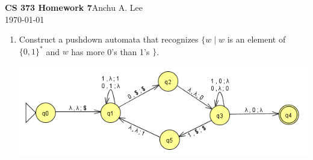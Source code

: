 \documentclass{article}
\begin{document}
    \noindent\textbf{CS 373 Homework 7}\hfill Anchu A. Lee\\
    \noindent\today\\
    \begin{enumerate}
        \item Construct a pushdown automata that recognizes $\{w \mid w $ is an element of $ \{0,1\}^* $ and $w$ has more 0's than 1's $ \}$.\\
        \begin{center}
            \includegraphics[scale=0.6]{machine1}
        \end{center}


\end{enumerate}
\end{document}
